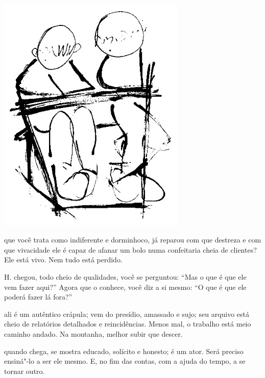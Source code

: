 \begin{vplace}[.50]
\begin{center}
\includegraphics[width=90mm]{./imgs/Image_5.jpg}
\end{center}
\end{vplace}

\pagebreak
\thispagestyle{empty}
\movetooddpage

 que você trata como indiferente e dorminhoco, já reparou com que
destreza e com que vivacidade ele é capaz de afanar um bolo numa
confeitaria cheia de clientes? Ele está vivo. Nem tudo está perdido.

\bigskip
\bigskip

 H. chegou, todo cheio de qualidades, você se perguntou: ``Mas o
que é que ele vem fazer aqui?'' Agora que o conhece, você diz a si
mesmo: ``O que é que ele poderá fazer lá fora?''

\bigskip
\bigskip

 ali é um autêntico crápula; vem do presídio, amassado e sujo; seu
arquivo está cheio de relatórios detalhados e reincidências. Menos mal,
o trabalho está meio caminho andado. Na montanha, melhor subir que
descer.

\bigskip
\bigskip

 quando chega, se mostra educado, solícito e honesto; é um ator. Será
preciso ensiná"-lo a ser ele mesmo. E, no fim das contas, com a ajuda do
tempo, a se tornar outro.

